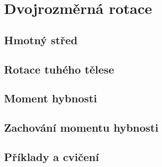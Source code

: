\chapter{Dvojrozměrná rotace}\label{fyz:IchapXVIII}
\minitoc
  \section{Hmotný střed}\label{fyz:IchapXVIIIsecI}
  \section{Rotace tuhého tělese}\label{fyz:IchapXVIIIsecII}
  \section{Moment hybnosti}\label{fyz:IchapXVIIIsecIII}
  \section{Zachování momentu hybnosti}\label{fyz:IchapXVIIIsecIV}
  \section{Příklady a cvičení}\label{fyz:IchapXVIIIsecVI}
